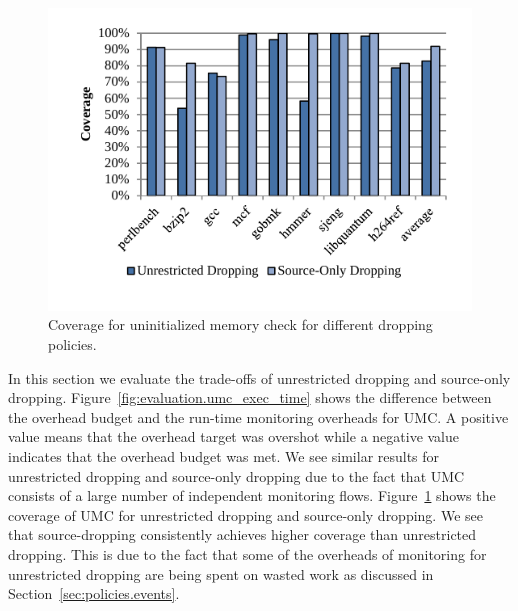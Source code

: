 \begin{figure}
  \begin{center}
    \includegraphics[width=\columnwidth]{figs/data_umc_coverage.pdf}
    \vspace{-0.2in}
    \caption{Coverage for uninitialized memory check for different dropping policies.}
    \label{fig:evaluation.umc_coverage}
    \vspace{-0.1in}
  \end{center}
\end{figure}
In this section we evaluate the trade-offs of unrestricted dropping and source-only dropping.
Figure~\ref{fig:evaluation.umc_exec_time} shows the difference between the
overhead budget and the run-time monitoring overheads for UMC. A positive value
means that the overhead target was overshot while a negative value indicates
that the overhead budget was met. We see similar results for unrestricted
dropping and source-only dropping due to the fact that UMC consists of a large
number of independent monitoring flows.
Figure~\ref{fig:evaluation.umc_coverage} shows the coverage of UMC for
unrestricted dropping and source-only dropping. We see that source-dropping
consistently achieves higher coverage than unrestricted dropping. This is due
to the fact that some of the overheads of monitoring for unrestricted dropping
are being spent on wasted work as discussed in Section~\ref{sec:policies.events}.

